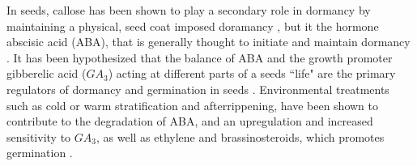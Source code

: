 \documentclass[12pt]{article}\usepackage[]{graphicx}\usepackage[]{color}
\begin{document}
\par In seeds, callose has been shown to play a secondary role in dormancy by maintaining a physical, seed coat imposed doramancy \citep{Leubner2003}, but it the hormone abscisic acid (ABA), that is generally thought to initiate and maintain dormancy \citep{Baskin2014, Fenner2000}. It has been hypothesized that the balance of ABA and the growth promoter gibberelic acid ($GA_3$) acting at different parts of a seeds ``life" are the primary regulators of dormancy and germination in seeds \citep{Leubner2003,Kucera2005}. Environmental treatments such as cold or warm stratification and afterrippening, have been shown to contribute to the degradation of ABA, and an upregulation and increased sensitivity to $GA_3$, as well as ethylene and brassinosteroids, which promotes germination \citep{Kucera2005}.
\end{document}
